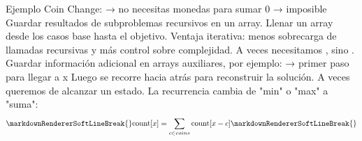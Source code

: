 \markdownRendererUlItem Ejemplo Coin Change:\markdownRendererInterblockSeparator
{}\markdownRendererUlBeginTight
\markdownRendererUlItem {} → no necesitas monedas para sumar 0\markdownRendererUlItemEnd 
\markdownRendererUlItem {} → imposible\markdownRendererUlItemEnd 
\markdownRendererUlEndTight \markdownRendererUlItemEnd 
\markdownRendererUlEndTight \markdownRendererInterblockSeparator
{}
\markdownRendererSectionEnd \markdownRendererSectionBegin
{}\markdownRendererInterblockSeparator
{}\markdownRendererUlBeginTight
\markdownRendererUlItem {} Guardar resultados de subproblemas recursivos en un array.\markdownRendererUlItemEnd 
\markdownRendererUlItem {} Llenar un array desde los casos base hasta el objetivo.\markdownRendererUlItemEnd 
\markdownRendererUlItem Ventaja iterativa: menos sobrecarga de llamadas recursivas y más control sobre complejidad.\markdownRendererUlItemEnd 
\markdownRendererUlEndTight \markdownRendererInterblockSeparator
{}
\markdownRendererSectionEnd \markdownRendererSectionBegin
{}\markdownRendererInterblockSeparator
{}\markdownRendererUlBeginTight
\markdownRendererUlItem A veces necesitamos , sino .\markdownRendererUlItemEnd 
\markdownRendererUlItem Guardar información adicional en arrays auxiliares, por ejemplo:\markdownRendererInterblockSeparator
{}\markdownRendererUlBeginTight
\markdownRendererUlItem {} → primer paso para llegar a x\markdownRendererUlItemEnd 
\markdownRendererUlEndTight \markdownRendererUlItemEnd 
\markdownRendererUlItem Luego se recorre hacia atrás para reconstruir la solución.\markdownRendererUlItemEnd 
\markdownRendererUlEndTight \markdownRendererInterblockSeparator
{}
\markdownRendererSectionEnd \markdownRendererSectionBegin
{}\markdownRendererInterblockSeparator
{}\markdownRendererUlBeginTight
\markdownRendererUlItem A veces queremos  de alcanzar un estado.\markdownRendererUlItemEnd 
\markdownRendererUlItem La recurrencia cambia de "min" o "max" a "suma":\markdownRendererSoftLineBreak
{}$$\markdownRendererSoftLineBreak
{}\text{count}[x] = \sum_{c \in coins} \text{count}[x-c]\markdownRendererSoftLineBreak
{}$$\markdownRendererUlItemEnd 
